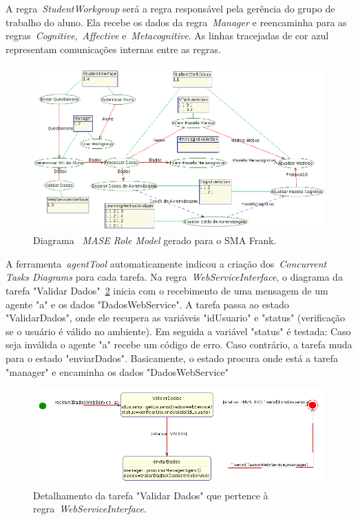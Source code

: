 A regra~\emph{StudentWorkgroup} será a regra responsável pela gerência do grupo de trabalho do aluno. Ela recebe os dados da regra~\emph{Manager} e reencaminha para as regras~\emph{Cognitive},~\emph{Affective} e~\emph{Metacognitive}. As linhas tracejadas de cor azul representam comunicações internas entre as regras.

\begin{figure}
	\centering
	\includegraphics[scale=0.48]{images/mase-role-model.png}
	\caption{Diagrama ~\emph{MASE Role Model} gerado para o SMA Frank.}
	\label{fig:frank-role-model}
\end{figure}

A ferramenta~\emph{agentTool} automaticamente indicou a criação dos~\emph{Concurrent Tasks Diagrams} para cada tarefa. Na regra~\emph{WebServiceInterface}, o diagrama da tarefa "Validar Dados"~\ref{fig:validar-dados} inicia com o recebimento de uma mensagem de um agente "a" e os dados "DadosWebService". A tarefa passa ao estado "ValidarDados", onde ele recupera as variáveis "idUsuario" e "status" (verificação se o usuário é válido no ambiente). Em seguida a variável "status" é testada: Caso seja inválida o agente "a" recebe um código de erro. Caso contrário, a tarefa muda para o estado "enviarDados". Basicamente, o estado procura onde está a tarefa "manager" e encaminha os dados "DadosWebService"
 
\begin{figure}
	\centering
	\includegraphics[scale=0.48]{images/td-validar-dados.png}
	\caption{Detalhamento da tarefa "Validar Dados" que pertence à regra~\emph{WebServiceInterface}.}
	\label{fig:validar-dados}
\end{figure}


